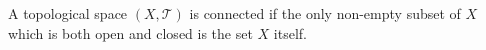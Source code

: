 A topological space $(X, \mathcal{T})$ is connected if the only non-empty subset of $X$ which is both open and closed is the set $X$ itself.